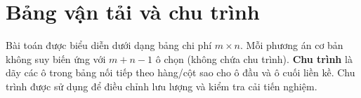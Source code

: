 \section{Bảng vận tải và chu trình}
Bài toán được biểu diễn dưới dạng bảng chi phí $m \times n$. Mỗi phương án cơ bản không suy biến ứng với $m+n-1$ ô chọn (không chứa chu trình). \textbf{Chu trình} là dãy các ô trong bảng nối tiếp theo hàng/cột sao cho ô đầu và ô cuối liền kề. Chu trình được sử dụng để điều chỉnh lưu lượng và kiểm tra cải tiến nghiệm.
